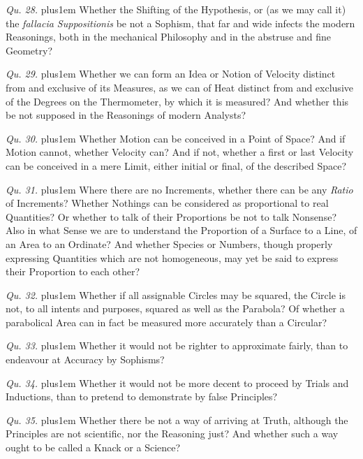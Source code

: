 \item{\it Qu. 28.} \hskip 0pt plus1em
Whether the Shifting of the Hypothesis, or (as we may call it)
the {\it fallacia Suppositionis\/} be not a Sophism, that far and
wide infects the modern Reasonings, both in the mechanical
Philosophy and in the abstruse and fine Geometry?

\item{\it Qu. 29.} \hskip 0pt plus1em
Whether we can form an Idea or Notion of Velocity distinct from
and exclusive of its Measures, as we can of Heat distinct from
and exclusive of the Degrees on the Thermometer, by which it is
measured?  And whether this be not supposed in the Reasonings of
modern Analysts?

\item{\it Qu. 30.} \hskip 0pt plus1em
Whether Motion can be conceived in a Point of Space?  And if
Motion cannot, whether Velocity can?  And if not, whether a first
or last Velocity can be conceived in a mere Limit, either initial
or final, of the described Space?

\item{\it Qu. 31.} \hskip 0pt plus1em
Where there are no Increments, whether there can be any {\it
Ratio\/} of Increments?  Whether Nothings can be considered as
proportional to real Quantities?  Or whether to talk of their
Proportions be not to talk Nonsense?  Also in what Sense we are
to understand the Proportion of a Surface to a Line, of an Area
to an Ordinate?  And whether Species or Numbers, though properly
expressing Quantities which are not homogeneous, may yet be said
to express their Proportion to each other?

\item{\it Qu. 32.} \hskip 0pt plus1em
Whether if all assignable Circles may be squared, the Circle is
not, to all intents and purposes, squared as well as the
Parabola?  Of whether a parabolical Area can in fact be measured
more accurately than a Circular?

\item{\it Qu. 33.} \hskip 0pt plus1em
Whether it would not be righter to approximate fairly, than to
endeavour at Accuracy by Sophisms?

\item{\it Qu. 34.} \hskip 0pt plus1em
Whether it would not be more decent to proceed by Trials and
Inductions, than to pretend to demonstrate by false Principles?

\item{\it Qu. 35.} \hskip 0pt plus1em
Whether there be not a way of arriving at Truth, although the
Principles are not scientific, nor the Reasoning just?  And
whether such a way ought to be called a Knack or a Science?

